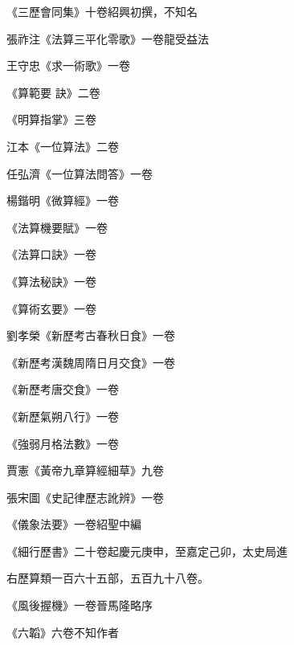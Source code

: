 \begin{pinyinscope}
 《三歷會同集》十卷紹興初撰，不知名



 張祚注《法算三平化零歌》一卷龍受益法



 王守忠《求一術歌》一卷



 《算範要
 訣》二卷



 《明算指掌》三卷



 江本《一位算法》二卷



 任弘濟《一位算法問答》一卷



 楊鍇明《微算經》一卷



 《法算機要賦》一卷



 《法算口訣》一卷



 《算法秘訣》一卷



 《算術玄要》一卷



 劉孝榮《新歷考古春秋日食》一卷



 《新歷考漢魏周隋日月交食》一卷



 《新歷考唐交食》一卷



 《新歷氣朔八行》一卷



 《強弱月格法數》一卷



 賈憲《黃帝九章算經細草》九卷



 張宋圖《史記律歷志訛辨》一卷



 《儀象法要》一卷紹聖中編



 《細行歷書》二十卷起慶元庚申，至嘉定己卯，太史局進



 右歷算類一百六十五部，五百九十八卷。



 《風後握機》一卷晉馬隆略序



 《六韜》六卷不知作者




\end{pinyinscope}

